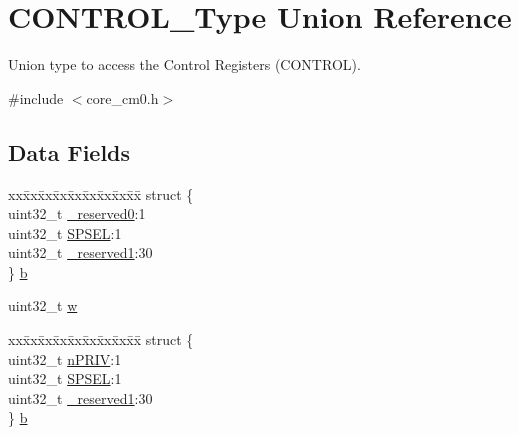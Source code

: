 \hypertarget{union_c_o_n_t_r_o_l___type}{}\section{C\+O\+N\+T\+R\+O\+L\+\_\+\+Type Union Reference}
\label{union_c_o_n_t_r_o_l___type}


Union type to access the Control Registers (C\+O\+N\+T\+R\+OL).  




{\ttfamily \#include $<$core\+\_\+cm0.\+h$>$}

\subsection*{Data Fields}
\begin{DoxyCompactItemize}
\item 
\begin{tabbing}
xx\=xx\=xx\=xx\=xx\=xx\=xx\=xx\=xx\=\kill
struct \{\\
\>uint32\_t \hyperlink{union_c_o_n_t_r_o_l___type_ac8a6a13838a897c8d0b8bc991bbaf7c1}{\_reserved0}:1\\
\>uint32\_t \hyperlink{union_c_o_n_t_r_o_l___type_ae185aac93686ffc78e998a9daf41415b}{SPSEL}:1\\
\>uint32\_t \hyperlink{union_c_o_n_t_r_o_l___type_a959a73d8faee56599b7e792a7c5a2d16}{\_reserved1}:30\\
\} \hyperlink{union_c_o_n_t_r_o_l___type_ab2a41711c248a319c2e7d0ab73c3a8b9}{b}\\

\end{tabbing}\item 
uint32\+\_\+t \hyperlink{union_c_o_n_t_r_o_l___type_ad0fb62e7a08e70fc5e0a76b67809f84b}{w}
\item 
\begin{tabbing}
xx\=xx\=xx\=xx\=xx\=xx\=xx\=xx\=xx\=\kill
struct \{\\
\>uint32\_t \hyperlink{union_c_o_n_t_r_o_l___type_a2a6e513e8a6bf4e58db169e312172332}{nPRIV}:1\\
\>uint32\_t \hyperlink{union_c_o_n_t_r_o_l___type_ae185aac93686ffc78e998a9daf41415b}{SPSEL}:1\\
\>uint32\_t \hyperlink{union_c_o_n_t_r_o_l___type_a959a73d8faee56599b7e792a7c5a2d16}{\_reserved1}:30\\
\} \hyperlink{union_c_o_n_t_r_o_l___type_a362f58ce033c684dddd5ae69c5417ef5}{b}\\


\end{tabbing}
\end{DoxyCompactItemize}
